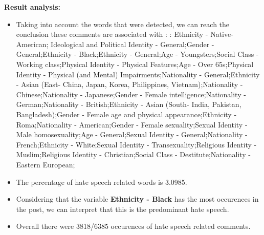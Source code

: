 \documentclass[11pt]{article}
\begin{document}
\textbf{\Large Result analysis:}

\begin{itemize}\item Taking into account the words that were detected, we can reach the conclusion these comments are associated with : : Ethnicity - Native-American; Ideological and Political Identity - General;Gender - General;Ethnicity - Black;Ethnicity - General;Age - Youngsters;Social Class - Working class;Physical Identity - Physical Features;Age - Over 65s;Physical Identity - Physical (and Mental) Impairments;Nationality - General;Ethnicity - Asian (East- China, Japan, Korea, Philippines, Vietnam);Nationality - Chinese;Nationality - Japanese;Gender - Female intelligence;Nationality - German;Nationality - British;Ethnicity - Asian (South- India, Pakistan, Bangladesh);Gender - Female age and physical appearance;Ethnicity - Roma;Nationality - American;Gender - Female sexuality;Sexual Identity - Male homosexuality;Age - General;Sexual Identity - General;Nationality - French;Ethnicity - White;Sexual Identity - Transexuality;Religious Identity - Muslim;Religious Identity - Christian;Social Class - Destitute;Nationality - Eastern European;%

\item The percentage of hate speech related words is 3.0985.

\item Considering that the variable \textbf{Ethnicity - Black} has the most occurences in the post, we can interpret that this is the predominant hate speech.

\item Overall there were 3818/6385 occurences of hate speech related comments.\end{itemize}
\end{document}
